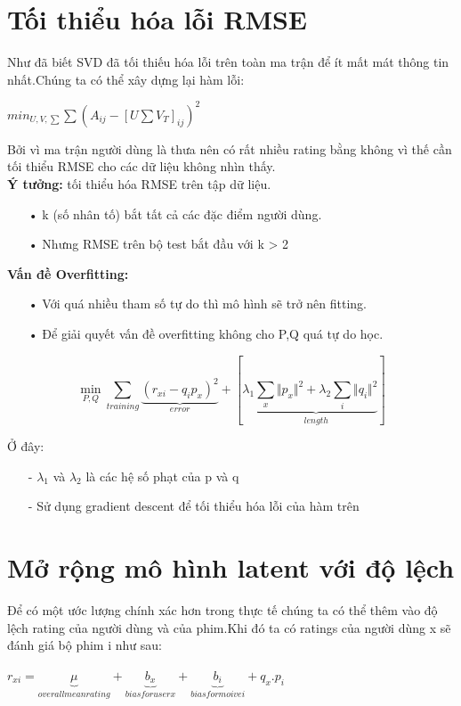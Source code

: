 \documentclass[a4paper,10pt]{report}
\begin{document}
\section{Tối thiểu hóa lỗi RMSE}
Như đã biết SVD đã tối thiếu hóa lỗi trên toàn ma trận để ít mất mát thông tin nhất.Chúng ta có thể xây dựng lại hàm lỗi:
\begin{center}
\LARGE{
$min_{U,V,\sum}\sum(A_{ij} - [U \sum V_{T}]_{ij})^2$
}
\end{center}
Bởi vì ma trận người dùng là thưa nên có rất nhiều rating bằng không vì thế cần tối thiểu RMSE cho các dữ liệu không nhìn thấy. \\ 
\textbf{Ý tưởng:} tối thiểu hóa RMSE trên tập dữ liệu.
\begin{itemize}
\item[•] k (số nhân tố) bắt tất cả các đặc điểm người dùng.
\item[•] Nhưng RMSE trên bộ test bắt đầu với k > 2
\end{itemize}
\textbf{Vấn đề Overfitting:}
\begin{itemize}
\item[•] Với quá nhiều tham số tự do thì mô hình sẽ trở nên fitting.
\item[•] Để giải quyết vấn đề overfitting không cho P,Q quá tự do học.
\end{itemize}
\begin{center}
\begin{displaymath}
\displaystyle\min_{P,Q} \sum_{training}\underbrace{(r_{xi} - q_ip_x)^2}_{error} + [\lambda_1\underbrace{\sum_{x}\Vert p_x \Vert^{2} + \lambda_2\sum_i\Vert q_i \Vert^2}_{length}]
\end{displaymath}
\end{center}
Ở đây:
\begin{itemize}
\item[-] $\lambda_1$ và $ \lambda_2$ là các hệ số phạt của p và q
\item[-] Sử dụng gradient descent để tối thiểu hóa lỗi của hàm trên
\end{itemize}
\section{Mở rộng mô hình latent với độ lệch}
Để có một ước lượng chính xác hơn trong thực tế chúng ta có thể thêm vào độ lệch rating của người dùng và của phim.Khi đó ta có ratings của người dùng x sẽ đánh giá bộ phim i như sau:
\begin{center}
$r_{xi} = \underbrace{\mu}_{overall mean rating} + \underbrace{b_{x}}_{bias for user x} + \underbrace{b_{i}}_{bias for moive i} + q_{x}.p_i$
\end{center}
\end{document}
